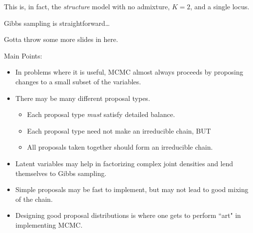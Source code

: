 This is, in fact, the {\em structure} model with no admixture, $K=2$, and a single locus.

Gibbs sampling is straightforward\ldots\hfill{}






Gotta throw some more slides in here.




Main Points:
\begin{itemize}
\item In problems where it is useful, MCMC almost always proceeds by proposing changes to a small subset of the variables.
\item There may be many different proposal types.
\begin{itemize}
\item Each proposal type {\em must} satisfy detailed balance.
\item Each proposal type need not make an irreducible chain, BUT
\item All proposals taken together should form an irreducible chain.
\end{itemize}
\item Latent variables may help in factorizing complex joint densities and lend themselves to Gibbs sampling.
\item Simple proposals may be fast to implement, but may not lead to good mixing of the chain.
\item Designing good proposal distributions is where one gets to perform ``art" in implementing MCMC.
\end{itemize}



